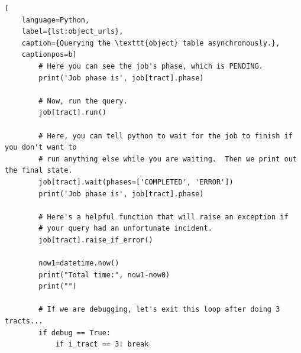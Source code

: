 \documentclass[DM,authoryear,toc]{lsstdoc}
\begin{document}
\begin{lstlisting}[
    language=Python,
    label={lst:object_urls},
    caption={Querying the \texttt{object} table asynchronously.},
    captionpos=b]
        # Here you can see the job's phase, which is PENDING.
        print('Job phase is', job[tract].phase)

        # Now, run the query.
        job[tract].run()

        # Here, you can tell python to wait for the job to finish if you don't want to
        # run anything else while you are waiting.  Then we print out the final state.
        job[tract].wait(phases=['COMPLETED', 'ERROR'])
        print('Job phase is', job[tract].phase)

        # Here's a helpful function that will raise an exception if
        # your query had an unfortunate incident.
        job[tract].raise_if_error()

        now1=datetime.now()
        print("Total time:", now1-now0)
        print("")

        # If we are debugging, let's exit this loop after doing 3 tracts...
        if debug == True:
            if i_tract == 3: break

\end{lstlisting}


\clearpage
\end{document}
